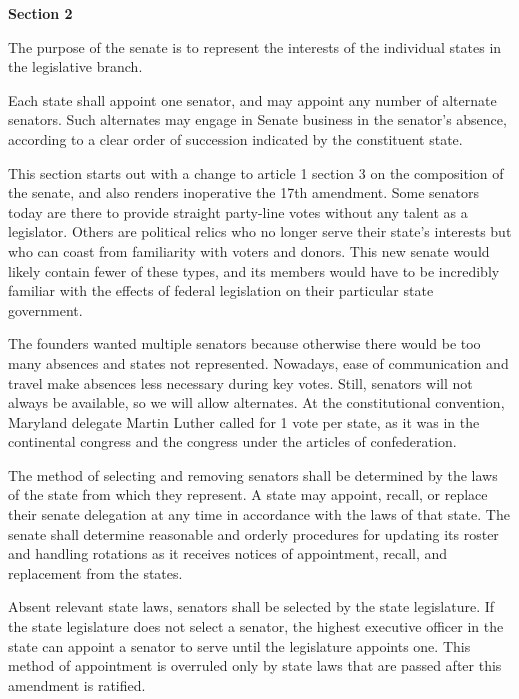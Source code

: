 \documentclass{article}
\begin{document}
\begin{quoting}
\textbf{Section 2}

The purpose of the senate is to represent the interests of the individual states in the legislative branch.

Each state shall appoint one senator, and may appoint any number of alternate senators. Such alternates may engage in Senate business in the senator’s absence, according to a clear order of succession indicated by the constituent state.
\end{quoting}

This section starts out with a change to article 1 section 3 on the composition of the senate, and also renders inoperative the 17th amendment. Some senators today are there to provide straight party-line votes without any talent as a legislator. Others are political relics who no longer serve their state’s interests but who can coast from familiarity with voters and donors. This new senate would likely contain fewer of these types, and its members would have to be incredibly familiar with the effects of federal legislation on their particular state government.

The founders wanted multiple senators because otherwise there would be too many absences and states not represented. Nowadays, ease of communication and travel make absences less necessary during key votes. Still, senators will not always be available, so we will allow alternates. At the constitutional convention, Maryland delegate Martin Luther called for 1 vote per state, as it was in the continental congress and the congress under the articles of confederation\cite{Senate}.

\begin{quoting}
The method of selecting and removing senators shall be determined by the laws of the state from which they represent. A state may appoint, recall, or replace their senate delegation at any time in accordance with the laws of that state. The senate shall determine reasonable and orderly procedures for updating its roster and handling rotations as it receives notices of appointment, recall, and replacement from the states.

Absent relevant state laws, senators shall be selected by the state legislature. If the state legislature does not select a senator, the highest executive officer in the state can appoint a senator to serve until the legislature appoints one. This method of appointment is overruled only by state laws that are passed after this amendment is ratified.
\end{quoting}
\end{document}
